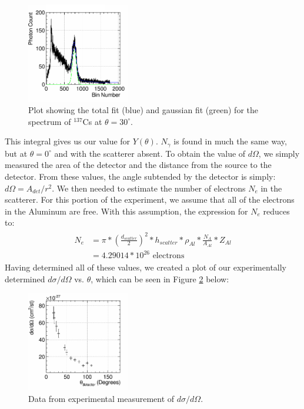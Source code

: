 \documentclass[%
 reprint,
 amsmath,amssymb,
 aps,
 pra,
]{revtex4-1}
\begin{document}
\begin{figure}[H]
	\centering
	\includegraphics[width=0.4\textwidth]{GaussianPortion.png}
	\caption{Plot showing the total fit (blue) and gaussian fit (green) for the spectrum of $^{137}$Cs at $\theta = 30^\circ$.}
	\label{GaussianPortion}
\end{figure}

This integral gives us our value for $Y(\theta)$. $N_\gamma$ is found in much the same way, but at $\theta = 0^\circ$ and with the scatterer absent. To obtain the value of $d\Omega$, we simply measured the area of the detector and the distance from the source to the detector. From these values, the angle subtended by the detector is simply: $d\Omega = A_{det}/r^2$. We then needed to estimate the number of electrons $N_e$ in the scatterer. For this portion of the experiment, we assume that all of the electrons in the Aluminum are free. With this assumption, the expression for $N_e$ reduces to:
\begin{gather}
	\begin{split}
		N_e 		& = \pi*\left(\frac{d_{scatter}}{2}\right)^2*h_{scatter}*\rho_{Al}*\frac{N_A}{A_{Al}}*Z_{Al} \\
				& = 4.29014*10^{26} \text{ electrons}
	\end{split} \nonumber
\end{gather}
\noindent Having determined all of these values, we created a plot of our experimentally determined $d\sigma / d\Omega$ vs. $\theta$, which can be seen in Figure \ref{KN} below:

\begin{figure}[H]
	\centering
	\includegraphics[width=0.4\textwidth]{KNvsThompson_DataOnly.png}
	\caption{Data from experimental measurement of $d\sigma/d\Omega$.}
	\label{KN}
\end{figure}
\end{document}
